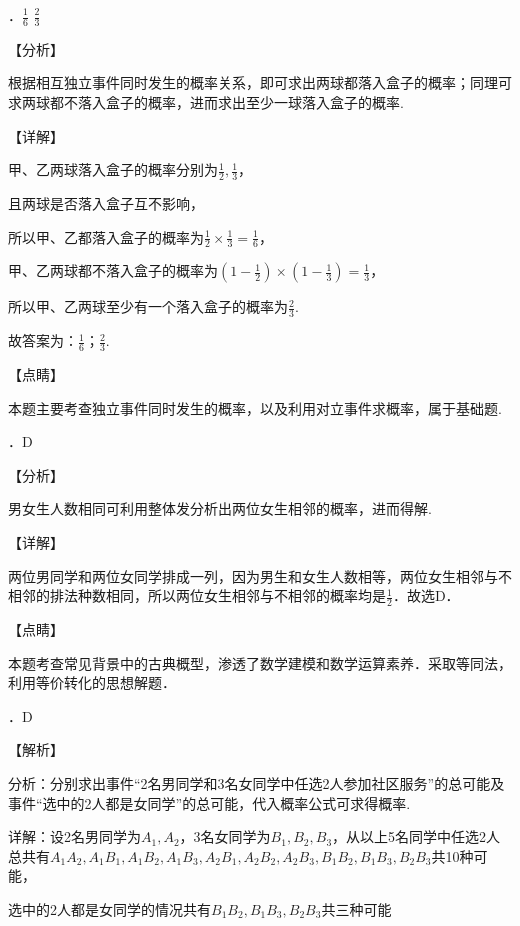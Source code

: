 \documentclass[a4paper,11pt,UTF8,twoside]{ctexart} %
\begin{document}
．$\frac{1}{6} $    $\frac{2}{3} $    

\noindent 【分析】

\noindent 根据相互独立事件同时发生的概率关系，即可求出两球都落入盒子的概率；同理可求两球都不落入盒子的概率，进而求出至少一球落入盒子的概率.

\noindent 【详解】

\noindent 甲、乙两球落入盒子的概率分别为$\frac{1}{2} ,\frac{1}{3} $，

\noindent 且两球是否落入盒子互不影响，

\noindent 所以甲、乙都落入盒子的概率为$\frac{1}{2} \times \frac{1}{3} =\frac{1}{6} $，

\noindent 甲、乙两球都不落入盒子的概率为$(1-\frac{1}{2} )\times (1-\frac{1}{3} )=\frac{1}{3} $，

\noindent 所以甲、乙两球至少有一个落入盒子的概率为$\frac{2}{3} $.

\noindent 故答案为：$\frac{1}{6} $；$\frac{2}{3} $.

\noindent 【点睛】

\noindent 本题主要考查独立事件同时发生的概率，以及利用对立事件求概率，属于基础题.

．D

\noindent 【分析】

\noindent 男女生人数相同可利用整体发分析出两位女生相邻的概率，进而得解.

\noindent 【详解】

\noindent 两位男同学和两位女同学排成一列，因为男生和女生人数相等，两位女生相邻与不相邻的排法种数相同，所以两位女生相邻与不相邻的概率均是$\frac{1}{2} $．故选D．

\noindent 【点睛】

\noindent 本题考查常见背景中的古典概型，渗透了数学建模和数学运算素养．采取等同法，利用等价转化的思想解题．

．D

\noindent 【解析】

\noindent 分析：分别求出事件``2名男同学和3名女同学中任选2人参加社区服务''的总可能及事件``选中的2人都是女同学''的总可能，代入概率公式可求得概率.

\noindent 详解：设2名男同学为$A_{1} ,A_{2} $，3名女同学为$B_{1} ,B_{2} ,B_{3} $，从以上5名同学中任选2人总共有$A_{1} A_{2} ,A_{1} B_{1} ,A_{1} B_{2} ,A_{1} B_{3} ,A_{2} B_{1} ,A_{2} B_{2} ,A_{2} B_{3} ,B_{1} B_{2} ,B_{1} B_{3} ,B_{2} B_{3} $共10种可能，

\noindent 选中的2人都是女同学的情况共有$B_{1} B_{2} ,B_{1} B_{3} ,B_{2} B_{3} $共三种可能
\end{document}
